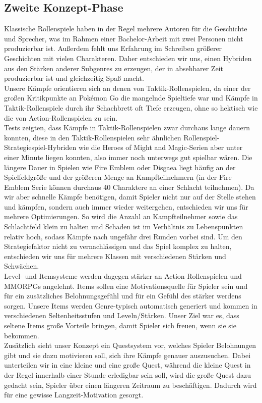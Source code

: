 \documentclass[extern,palatino]{cgBA}
\begin{document}
\subsection{Zweite Konzept-Phase}
Klassische Rollenspiele haben in der Regel mehrere Autoren für die Geschichte und Sprecher, was im Rahmen einer Bachelor-Arbeit mit zwei Personen nicht produzierbar ist. Außerdem fehlt uns Erfahrung im Schreiben größerer Geschichten mit vielen Charakteren. Daher entschieden wir uns, einen Hybriden aus den Stärken anderer Subgenres zu erzeugen, der in absehbarer Zeit produzierbar ist und gleichzeitig Spaß macht. 
\\Unsere Kämpfe orientieren sich an denen von Taktik-Rollenspielen, da einer der großen Kritikpunkte an Pokémon Go die mangelnde Spieltiefe war und Kämpfe in Taktik-Rollenspiele durch ihr Schachbrett oft Tiefe erzeugen, ohne so hektisch wie die von Action-Rollenspielen zu sein. \\Tests zeigten, dass Kämpfe in Taktik-Rollenspielen zwar durchaus lange dauern konnten, diese in den Taktik-Rollenspielen sehr ähnlichen Rollenspiel-Strategiespiel-Hybriden wie die Heroes of Might and Magic-Serien aber unter einer Minute liegen konnten, also immer noch unterwegs gut spielbar wären. Die längere Dauer in Spielen wie Fire Emblem oder Disgaea liegt häufig an der Spielfeldgröße und der größeren Menge an Kampfteilnehmern (in der Fire Emblem Serie können durchaus 40 Charaktere an einer Schlacht teilnehmen). Da wir aber schnelle Kämpfe benötigen, damit Spieler nicht nur auf der Stelle stehen und kämpfen,  sondern auch immer wieder weitergehen, entschieden wir uns für mehrere Optimierungen. So wird die Anzahl an Kampfteilnehmer sowie das Schlachtfeld klein zu halten und Schaden ist im Verhältnis zu Lebenspunkten relativ hoch, sodass Kämpfe nach ungefähr drei Runden vorbei sind. Um den Strategiefaktor nicht zu vernachlässigen und das Spiel komplex zu halten, entschieden wir uns für mehrere Klassen mit verschiedenen Stärken und Schwächen.
\\Level- und Itemsysteme werden dagegen stärker an Action-Rollenspielen und MMORPGs angelehnt. Items sollen eine Motivationsquelle für Spieler sein und für ein zusätzliches Belohnungsgefühl und für ein Gefühl des stärker werdens sorgen. 
Unsere Items werden Genre-typisch automatisch generiert und kommen in verschiedenen Seltenheitsstufen und Leveln/Stärken. Unser Ziel war es, dass seltene Items große Vorteile bringen, damit Spieler sich freuen, wenn sie sie bekommen.
\\Zusätzlich sieht unser Konzept ein Questsystem vor, welches Spieler Belohnungen gibt und sie dazu motivieren soll, sich ihre Kämpfe genauer auszusuchen. Dabei unterteilen wir in eine kleine und eine große Quest, während die kleine Quest in der Regel innerhalb einer Stunde erledigbar sein soll, wird die große Quest dazu gedacht sein, Spieler über einen längeren Zeitraum zu beschäftigen. Dadurch wird für eine gewisse Langzeit-Motivation gesorgt.
\end{document}
